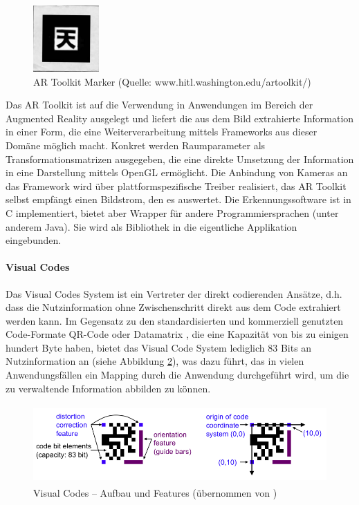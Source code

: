 \begin{figure}[htbp]
	\centering
		\includegraphics[height=1in]{img/ImplementierungInput/artoolkit.jpg}
	\caption{AR Toolkit Marker (Quelle: www.hitl.washington.edu/artoolkit/)}
	\label{fig:img_ImplementierungInput_artoolkit}
\end{figure}

Das AR Toolkit ist auf die Verwendung in Anwendungen im Bereich der Augmented Reality ausgelegt und liefert die aus dem Bild extrahierte Information in einer Form, die eine Weiterverarbeitung mittels Frameworks aus dieser Domäne möglich macht. Konkret werden Raumparameter als Transformationsmatrizen ausgegeben, die eine direkte Umsetzung der Information in eine Darstellung mittels OpenGL ermöglicht. Die Anbindung von Kameras an das Framework wird über plattformspezifische Treiber realisiert, das AR Toolkit selbst empfängt einen Bildstrom, den es auswertet. Die Erkennungssoftware ist in C implementiert, bietet aber Wrapper für andere Programmiersprachen (unter anderem Java). Sie wird als Bibliothek in die eigentliche Applikation eingebunden.


\paragraph{Visual Codes}\label{par:visualcodes}

Das Visual Codes System \citep{Rohs05} ist ein Vertreter der direkt codierenden Ansätze, d.h. dass die Nutzinformation ohne Zwischenschritt direkt aus dem Code extrahiert werden kann. Im Gegensatz zu den standardisierten und kommerziell genutzten Code-Formate QR-Code \citep{QR2008} oder Datamatrix \citep{GS108}, die eine Kapazität von bis zu einigen hundert Byte haben, bietet das Visual Code System lediglich 83 Bits an Nutzinformation an (siehe Abbildung \ref{fig:img_ImplementierungInput_visualcodes}), was dazu führt, das in vielen Anwendungsfällen ein Mapping durch die Anwendung durchgeführt wird, um die zu verwaltende Information abbilden zu können.

\begin{figure}[htbp]
	\centering
		\includegraphics[height=3cm]{img/ImplementierungInput/visualcodes.png}
	\caption{Visual Codes -- Aufbau und Features (übernommen von \citet{Rohs04})}
	\label{fig:img_ImplementierungInput_visualcodes}
\end{figure}


